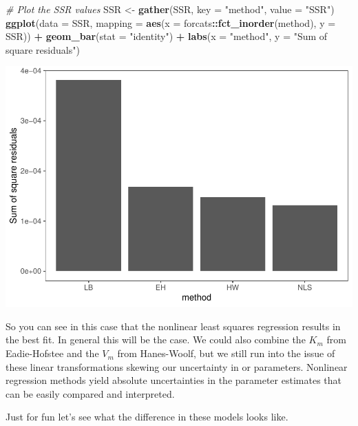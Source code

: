 \documentclass[
]{article}
\newenvironment{Shaded}{\begin{snugshade}}{\end{snugshade}}
\newcommand{\AttributeTok}[1]{\textcolor[rgb]{0.13,0.29,0.53}{#1}}
\newcommand{\CommentTok}[1]{\textcolor[rgb]{0.56,0.35,0.01}{\textit{#1}}}
\newcommand{\FunctionTok}[1]{\textcolor[rgb]{0.13,0.29,0.53}{\textbf{#1}}}
\newcommand{\NormalTok}[1]{#1}
\newcommand{\OtherTok}[1]{\textcolor[rgb]{0.56,0.35,0.01}{#1}}
\newcommand{\SpecialCharTok}[1]{\textcolor[rgb]{0.81,0.36,0.00}{\textbf{#1}}}
\newcommand{\StringTok}[1]{\textcolor[rgb]{0.31,0.60,0.02}{#1}}
\begin{document}
\begin{Shaded}
\begin{Highlighting}[]
\CommentTok{\# Plot the SSR values}
\NormalTok{SSR }\OtherTok{\textless{}{-}} \FunctionTok{gather}\NormalTok{(SSR, }\AttributeTok{key =} \StringTok{"method"}\NormalTok{, }\AttributeTok{value =} \StringTok{"SSR"}\NormalTok{)}
\FunctionTok{ggplot}\NormalTok{(}\AttributeTok{data =}\NormalTok{ SSR, }\AttributeTok{mapping =} \FunctionTok{aes}\NormalTok{(}\AttributeTok{x =}\NormalTok{ forcats}\SpecialCharTok{::}\FunctionTok{fct\_inorder}\NormalTok{(method),}
    \AttributeTok{y =}\NormalTok{ SSR)) }\SpecialCharTok{+} \FunctionTok{geom\_bar}\NormalTok{(}\AttributeTok{stat =} \StringTok{"identity"}\NormalTok{) }\SpecialCharTok{+} \FunctionTok{labs}\NormalTok{(}\AttributeTok{x =} \StringTok{"method"}\NormalTok{,}
    \AttributeTok{y =} \StringTok{"Sum of square residuals"}\NormalTok{)}
\end{Highlighting}
\end{Shaded}

\includegraphics{Bioprocess_Engineering_files/figure-latex/unnamed-chunk-39-1.pdf}

So you can see in this case that the nonlinear least squares regression results in the best fit. In general this will be the case. We could also combine the \(K_m\) from Eadie-Hofstee and the \(V_m\) from Hanes-Woolf, but we still run into the issue of these linear transformations skewing our uncertainty in or parameters. Nonlinear regression methods yield absolute uncertainties in the parameter estimates that can be easily compared and interpreted.

Just for fun let's see what the difference in these models looks like.
\end{document}
